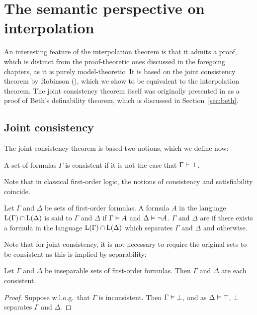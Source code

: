 
\chapter{The semantic perspective on interpolation}
\label{chap:semantic}

An interesting feature of the interpolation theorem is that it admits a proof, which is distinct from the proof-theoretic ones discussed in the foregoing chapters, as it is purely model-theoretic.
It is based on the joint consistency theorem by Robinson (\cite{robinson1956result}), which we show to be equivalent to the interpolation theorem.
The joint consistency theorem itself was originally presented in \cite{robinson1956result} as a proof of Beth's definability theorem, which is discussed in Section~\ref{sec:beth}.

\section{Joint consistency}
\label{sec:joint_consistency}

The joint consistency theorem is based two notions, which we define now:

\begin{defi}[Consistency]
	A set of formulas $\Gamma$ is consistent if it is not the case that $\Gamma \vdash \bot$.
\end{defi}

Note that in classical first-order logic, the notions of consistency and satisfiability coincide.

\begin{defi}[Separability]
	Let $\Gamma$ and $\Delta$ be sets of first-order formulas.
	A formula $A$ in the language $\operatorname{L}(\Gamma)\cap \operatorname{L}(\Delta)$ is said to  $\Gamma$ and $\Delta$ if $\Gamma \vDash A$ and $\Delta \vDash \lnot A$.
	$\Gamma$ and $\Delta$ are  if there exists a formula in the language $\operatorname{L}(\Gamma)\cap \operatorname{L}(\Delta)$ which separates $\Gamma$ and $\Delta$ and  otherwise.
\end{defi}

Note that for joint consistency, it is not necessary to require the original sets to be consistent as this is implied by separability:

\begin{lemma}
	\label{lemma:insep_consistent}
	Let $\Gamma$ and $\Delta$ be inseparable sets of first-order formulas. Then $\Gamma$ and $\Delta$ are each consistent.
\end{lemma}
\begin{proof}
	Suppose w.l.o.g.\ that $\Gamma$ is inconsistent. Then $\Gamma \vDash \bot$, and as $\Delta \vDash \top$, $\bot$ separates $\Gamma$ and $\Delta$.
\end{proof}

